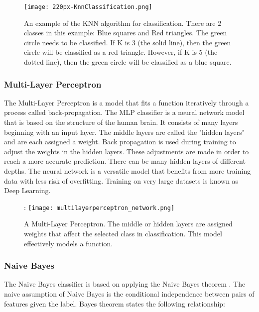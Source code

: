 \begin{figure}[htp]
    \centering
    \texttt{[image: 220px-KnnClassification.png]}
    \caption{An example of the KNN algorithm for classification.
    There are 2 classes in this example: Blue squares and Red triangles.
    The green circle needs to be classified.
    If K is 3 (the solid line), then the green circle will be classified as a red triangle.
    However, if K is 5 (the dotted line), then the green circle will be classified as a blue square.}
    \label{fig:knn}
\end{figure}


\subsubsection{Multi-Layer Perceptron}
The Multi-Layer Perceptron is a model that fits a function iteratively through a process called back-propagation.
The MLP classifier is a neural network model that is based on the structure of the human brain.
It consists of many layers beginning with an input layer.
The middle layers are called the "hidden layers" and are each assigned a weight.
Back propagation is used during training to adjust the weights in the hidden layers.
These adjustments are made in order to reach a more accurate prediction.
There can be many hidden layers of different depths.
The neural network is a versatile model that benefits from more training data with less risk of overfitting.
Training on very large datasets is known as Deep Learning.

\begin{figure}[htp]:
    \centering
    \texttt{[image: multilayerperceptron\_network.png]}
    \caption{A Multi-Layer Perceptron.
    The middle or hidden layers are assigned weights that affect the selected class in classification.
    This model effectively models a function.}
    \label{}
\end{figure}



\subsubsection{Naive Bayes}
The Naive Bayes classifier is based on applying the Naive Bayes theorem \cite{zhang2004optimality}.
The naive assumption of Naive Bayes is the conditional independence between pairs of features given the label.
Bayes theorem states the following relationship:

